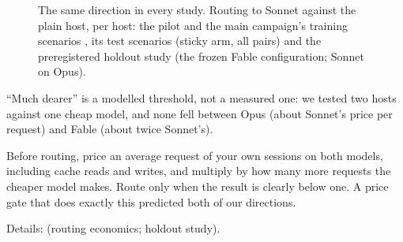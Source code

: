 \begin{figure}[tbp]
\centering
{}\par\smallskip

\caption{The same direction in every study. Routing to Sonnet against the plain host, per host: the pilot and the
main campaign's training scenarios \expl, its test scenarios (sticky arm, all pairs) and the preregistered holdout
study (the frozen Fable configuration; Sonnet on Opus).}
\label{fig:replication}
\end{figure}

``Much dearer'' is a modelled threshold, not a measured one: we tested two hosts against one cheap model, and none fell between Opus (about Sonnet's price per request) and Fable (about twice Sonnet's).

\begin{keyidea}[title={For practitioners}]
Before routing, price an average request of your own sessions on both models, including cache reads and writes, and
multiply by how many more requests the cheaper model makes. Route only when the result is clearly below one. A price
gate that does exactly this predicted both of our directions.
\end{keyidea}

Details:  (routing economics; holdout study).
